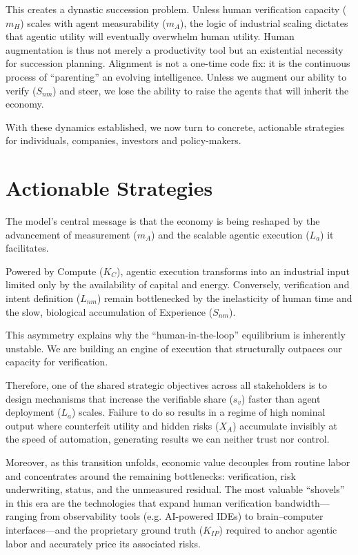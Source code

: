 \documentclass[12pt, letter]{article}
\begin{document}
This creates a dynastic succession problem. Unless human verification capacity ($m_H$) scales with agent measurability ($m_A$), the logic of industrial scaling dictates that agentic utility will eventually overwhelm human utility. Human augmentation is thus not merely a productivity tool but an existential necessity for succession planning. Alignment is not a one-time code fix: it is the continuous process of ``parenting'' an evolving intelligence. Unless we augment our ability to verify ($S_{nm}$) and steer, we lose the ability to raise the agents that will inherit the economy.

With these dynamics established, we now turn to concrete, actionable strategies for individuals, companies, investors and policy-makers.

\clearpage

\section{Actionable Strategies}\label{sec:actionable_strategies}

The model’s central message is that the economy is being reshaped by the advancement of measurement ($m_A$) and the scalable agentic execution ($L_a$) it facilitates.

Powered by Compute ($K_C$), agentic execution transforms into an industrial input limited only by the availability of capital and energy. Conversely, verification and intent definition ($L_{nm}$) remain bottlenecked by the inelasticity of human time and the slow, biological accumulation of Experience ($S_{nm}$).

This asymmetry explains why the ``human-in-the-loop'' equilibrium is inherently unstable. We are building an engine of execution that structurally outpaces our capacity for verification.

Therefore, one of the shared strategic objectives across all stakeholders is to design mechanisms that increase the verifiable share ($s_v$) faster than agent deployment ($L_a$) scales. Failure to do so results in a regime of high nominal output where counterfeit utility and hidden risks ($X_A$) accumulate invisibly at the speed of automation, generating results we can neither trust nor control.

Moreover, as this transition unfolds, economic value decouples from routine labor and concentrates around the remaining bottlenecks: verification, risk underwriting, status, and the unmeasured residual. The most valuable ``shovels'' in this era are the technologies that expand human verification bandwidth—ranging from observability tools (e.g. AI-powered IDEs) to brain–computer interfaces—and the proprietary ground truth ($K_{IP}$) required to anchor agentic labor and accurately price its associated risks.
\end{document}
